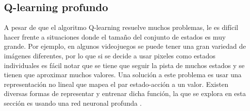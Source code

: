 	
	
	
	

\subsection{Q-learning profundo}

A pesar de que el algoritmo Q-learning resuelve muchos problemas, 
le es difícil hacer frente a situaciones donde el tamaño del conjunto de estados
es muy grande. Por ejemplo, en algunos videojuegos se puede tener una gran variedad
de imágenes diferentes, por lo que  si se decide a usar pixeles como 
estados individuales es fácil notar que se tiene que seguir la pista de muchos
estados y se tienen que aproximar muchos valores. 
Una solución a este problema es usar una representación no lineal que mapea 
el par estado-acción a un valor.
Existen diversas formas de representar y entrenar dicha función, la que 
se explora en esta sección es usando una red neuronal profunda \cite{lapan_2020, Goodfellow-et-al-2016}.

